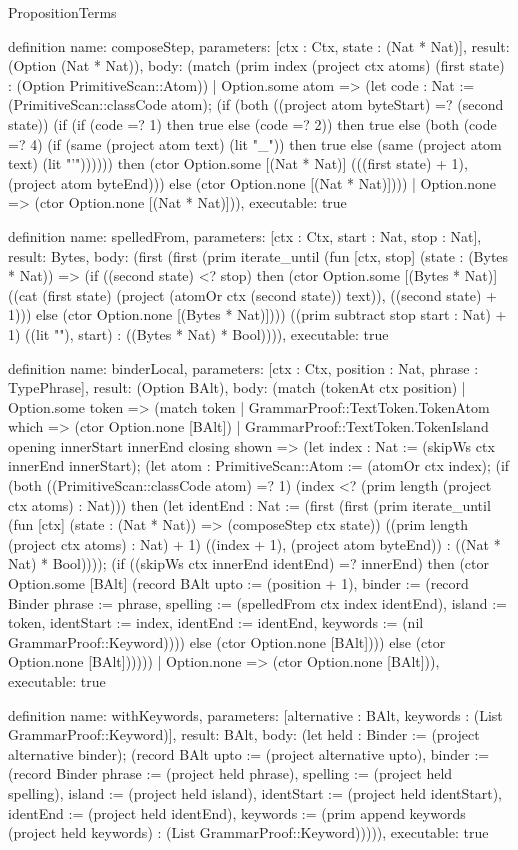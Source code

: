 \begin{lexlean}{PropositionTerms}
\begin{semanticmodule}
definition{
  name: composeStep,
  parameters: [ctx : Ctx, state : (Nat * Nat)],
  result: (Option (Nat * Nat)),
  body: (match (prim index (project ctx atoms) (first state) : (Option PrimitiveScan::Atom))
    | Option.some atom => (let code : Nat := (PrimitiveScan::classCode atom); (if (both ((project atom byteStart) =? (second state)) (if (if (code =? 1) then true else (code =? 2)) then true else (both (code =? 4) (if (same (project atom text) (lit "_")) then true else (same (project atom text) (lit "'")))))) then (ctor Option.some [(Nat * Nat)] (((first state) + 1), (project atom byteEnd))) else (ctor Option.none [(Nat * Nat)])))
    | Option.none => (ctor Option.none [(Nat * Nat)])),
  executable: true
}

definition{
  name: spelledFrom,
  parameters: [ctx : Ctx, start : Nat, stop : Nat],
  result: Bytes,
  body: (first (first (prim iterate_until (fun [ctx, stop] (state : (Bytes * Nat)) => (if ((second state) <? stop) then (ctor Option.some [(Bytes * Nat)] ((cat (first state) (project (atomOr ctx (second state)) text)), ((second state) + 1))) else (ctor Option.none [(Bytes * Nat)]))) ((prim subtract stop start : Nat) + 1) ((lit ""), start) : ((Bytes * Nat) * Bool)))),
  executable: true
}

definition{
  name: binderLocal,
  parameters: [ctx : Ctx, position : Nat, phrase : TypePhrase],
  result: (Option BAlt),
  body: (match (tokenAt ctx position)
    | Option.some token => (match token
      | GrammarProof::TextToken.TokenAtom which => (ctor Option.none [BAlt])
      | GrammarProof::TextToken.TokenIsland opening innerStart innerEnd closing shown => (let index : Nat := (skipWs ctx innerEnd innerStart); (let atom : PrimitiveScan::Atom := (atomOr ctx index); (if (both ((PrimitiveScan::classCode atom) =? 1) (index <? (prim length (project ctx atoms) : Nat))) then (let identEnd : Nat := (first (first (prim iterate_until (fun [ctx] (state : (Nat * Nat)) => (composeStep ctx state)) ((prim length (project ctx atoms) : Nat) + 1) ((index + 1), (project atom byteEnd)) : ((Nat * Nat) * Bool)))); (if ((skipWs ctx innerEnd identEnd) =? innerEnd) then (ctor Option.some [BAlt] (record BAlt {upto := (position + 1), binder := (record Binder {phrase := phrase, spelling := (spelledFrom ctx index identEnd), island := token, identStart := index, identEnd := identEnd, keywords := (nil GrammarProof::Keyword)})})) else (ctor Option.none [BAlt]))) else (ctor Option.none [BAlt])))))
    | Option.none => (ctor Option.none [BAlt])),
  executable: true
}

definition{
  name: withKeywords,
  parameters: [alternative : BAlt, keywords : (List GrammarProof::Keyword)],
  result: BAlt,
  body: (let held : Binder := (project alternative binder); (record BAlt {upto := (project alternative upto), binder := (record Binder {phrase := (project held phrase), spelling := (project held spelling), island := (project held island), identStart := (project held identStart), identEnd := (project held identEnd), keywords := (prim append keywords (project held keywords) : (List GrammarProof::Keyword))})})),
  executable: true
}


\end{semanticmodule}
\end{lexlean}
